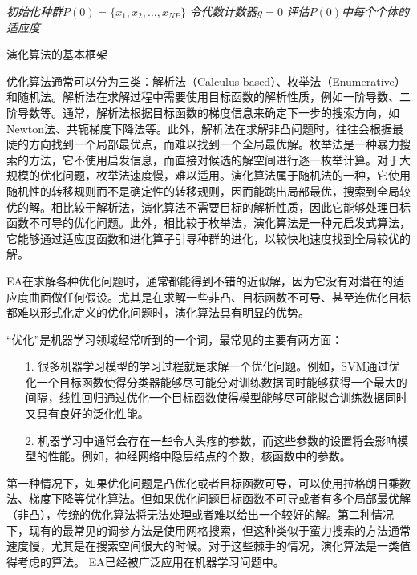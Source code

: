 \IncMargin{1em}
\begin{algorithm}
\emph{初始化种群$P(0) = \{x_{1},x_{2},\dots ,x_{NP}\}$}\;
\emph{令代数计数器$g = 0$}\;
\emph{评估$P(0)$中每个个体的适应度}\;
\caption{演化算法的基本框架}\label{alg_EA}
\end{algorithm}\DecMargin{1em}

优化算法通常可以分为三类：解析法（Calculus-based）、枚举法（Enumerative）和随机法\citep{潘正君1998演化计算}。解析法在求解过程中需要使用目标函数的解析性质，例如一阶导数、二阶导数等。通常，解析法根据目标函数的梯度信息来确定下一步的搜索方向，如Newton法、共轭梯度下降法等。此外，解析法在求解非凸问题时，往往会根据最陡的方向找到一个局部最优点，而难以找到一个全局最优解。枚举法是一种暴力搜索的方法，它不使用启发信息，而直接对候选的解空间进行逐一枚举计算。对于大规模的优化问题，枚举法速度慢，难以适用。演化算法属于随机法的一种，它使用随机性的转移规则而不是确定性的转移规则，因而能跳出局部最优，搜索到全局较优的解。相比较于解析法，演化算法不需要目标的解析性质，因此它能够处理目标函数不可导的优化问题。此外，相比较于枚举法，演化算法是一种元启发式算法，它能够通过适应度函数和进化算子引导种群的进化，以较快地速度找到全局较优的解。

EA在求解各种优化问题时，通常都能得到不错的近似解，因为它没有对潜在的适应度曲面做任何假设。尤其是在求解一些非凸、目标函数不可导、甚至连优化目标都难以形式化定义的优化问题时，演化算法具有明显的优势。

“优化”是机器学习领域经常听到的一个词，最常见的主要有两方面：
\begin{enumerate}
\item[1.]很多机器学习模型的学习过程就是求解一个优化问题。例如，SVM通过优化一个目标函数使得分类器能够尽可能分对训练数据同时能够获得一个最大的间隔，线性回归通过优化一个目标函数使得模型能够尽可能拟合训练数据同时又具有良好的泛化性能。
\item[2.]机器学习中通常会存在一些令人头疼的参数，而这些参数的设置将会影响模型的性能。例如，神经网络中隐层结点的个数，核函数中的参数。
\end{enumerate}
第一种情况下，如果优化问题是凸优化或者目标函数可导，可以使用拉格朗日乘数法、梯度下降等优化算法。但如果优化问题目标函数不可导或者有多个局部最优解（非凸），传统的优化算法将无法处理或者难以给出一个较好的解。第二种情况下，现有的最常见的调参方法是使用网格搜索，但这种类似于蛮力搜素的方法通常速度慢，尤其是在搜索空间很大的时候。对于这些棘手的情况，演化算法是一类值得考虑的算法。
EA已经被广泛应用在机器学习问题中\citep{liu2000evolutionary}\citep{tang2005linear}\citep{liu2000ensemble}。


